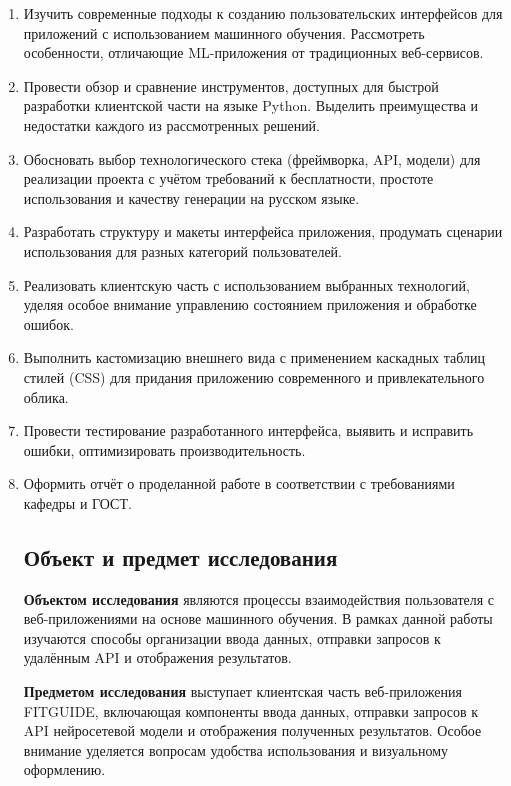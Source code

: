 \documentclass[14pt, a4paper]{extarticle}
\begin{document}
\begin{enumerate}
\item Изучить современные подходы к созданию пользовательских интерфейсов для приложений с использованием машинного обучения. Рассмотреть особенности, отличающие ML-приложения от традиционных веб-сервисов.

\item Провести обзор и сравнение инструментов, доступных для быстрой разработки клиентской части на языке Python. Выделить преимущества и недостатки каждого из рассмотренных решений.

\item Обосновать выбор технологического стека (фреймворка, API, модели) для реализации проекта с учётом требований к бесплатности, простоте использования и качеству генерации на русском языке.

\item Разработать структуру и макеты интерфейса приложения, продумать сценарии использования для разных категорий пользователей.

\item Реализовать клиентскую часть с использованием выбранных технологий, уделяя особое внимание управлению состоянием приложения и обработке ошибок.

\item Выполнить кастомизацию внешнего вида с применением каскадных таблиц стилей (CSS) для придания приложению современного и привлекательного облика.

\item Провести тестирование разработанного интерфейса, выявить и исправить ошибки, оптимизировать производительность.

\item Оформить отчёт о проделанной работе в соответствии с требованиями кафедры и ГОСТ.

\subsection*{Объект и предмет исследования}

\noindent \textbf{Объектом исследования} являются процессы взаимодействия пользователя с веб-приложениями на основе машинного обучения. В рамках данной работы изучаются способы организации ввода данных, отправки запросов к удалённым API и отображения результатов.

\medskip
\noindent \textbf{Предметом исследования} выступает клиентская часть веб-приложения FITGUIDE, включающая компоненты ввода данных, отправки запросов к API нейросетевой модели и отображения полученных результатов. Особое внимание уделяется вопросам удобства использования и визуальному оформлению.


\end{enumerate}
\end{document}
